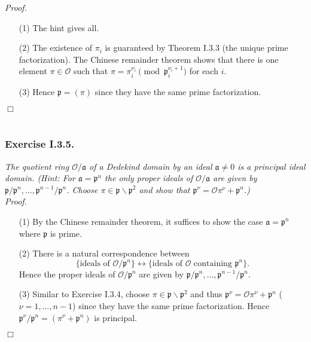 \documentclass{article}
\begin{document}
\emph{Proof.}
\begin{enumerate}
\item[(1)]
  The hint gives all.

\item[(2)]
  The existence of $\pi_i$ is guaranteed by Theorem I.3.3 (the unique prime factorization).
  The Chinese remainder theorem shows that there is one element $\pi \in \mathcal{O}$
  such that $\pi = \pi_i^{\nu_i} \pmod{\mathfrak{p}_{i}^{\nu_i+1}}$ for each $i$.

\item[(3)]
  Hence $\mathfrak{p} = (\pi)$ since they have the same prime factorization.
\end{enumerate}
$\Box$ \\\\






\subsubsection*{Exercise I.3.5.}
\emph{The quotient ring $\mathcal{O}/\mathfrak{a}$ of a Dedekind domain by
an ideal $\mathfrak{a} \neq 0$ is a principal ideal domain.
(Hint: For $\mathfrak{a} = \mathfrak{p}^n$ the only proper ideals of $\mathcal{O}/\mathfrak{a}$
are given by $\mathfrak{p}/\mathfrak{p}^n, \ldots, \mathfrak{p}^{n-1}/\mathfrak{p}^n$.
Choose $\pi \in \mathfrak{p} \smallsetminus \mathfrak{p}^2$
and show that $\mathfrak{p}^{\nu} = \mathcal{O}\pi^{\nu} + \mathfrak{p}^n$.)} \\



\emph{Proof.}
\begin{enumerate}
\item[(1)]
  By the Chinese remainder theorem,
  it suffices to show the case $\mathfrak{a} = \mathfrak{p}^n$ where $\mathfrak{p}$ is prime.

\item[(2)]
  There is a natural correspondence between
  \[
    \{ \text{ideals of $\mathcal{O}/\mathfrak{p}^n$} \}
    \longleftrightarrow
    \{ \text{ideals of $\mathcal{O}$ containing $\mathfrak{p}^n$} \}.
  \]
  Hence the proper ideals of $\mathcal{O}/\mathfrak{p}^n$
  are given by $\mathfrak{p}/\mathfrak{p}^n, \ldots, \mathfrak{p}^{n-1}/\mathfrak{p}^n$.

\item[(3)]
  Similar to Exercise I.3.4,
  choose $\pi \in \mathfrak{p} \smallsetminus \mathfrak{p}^2$
  and thus $\mathfrak{p}^{\nu} = \mathcal{O}\pi^{\nu} + \mathfrak{p}^n$
  ($\nu = 1, \ldots, n-1$)
  since they have the same prime factorization.
  Hence
  $\mathfrak{p}^{\nu}/\mathfrak{p}^n = (\pi^{\nu} + \mathfrak{p}^n)$ is principal.
\end{enumerate}
$\Box$ \\\\
\end{document}
